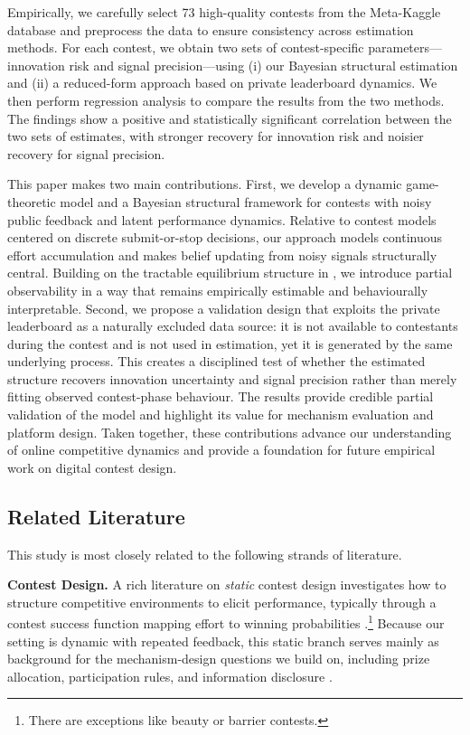 \documentclass[mnsc]{informs3}
\begin{document}
Empirically, we carefully select 73 high-quality contests from the Meta-Kaggle database and preprocess the data to ensure consistency across estimation methods.
For each contest, we obtain two sets of contest-specific parameters—innovation risk and signal precision—using (i) our Bayesian structural estimation and (ii) a reduced-form approach based on private leaderboard dynamics.
We then perform regression analysis to compare the results from the two methods.
The findings show a positive and statistically significant correlation between the two sets of estimates, with stronger recovery for innovation risk and noisier recovery for signal precision.


This paper makes two main contributions.
First, we develop a dynamic game-theoretic model and a Bayesian structural framework for contests with noisy public feedback and latent performance dynamics.
Relative to contest models centered on discrete submit-or-stop decisions, our approach models continuous effort accumulation and makes belief updating from noisy signals structurally central.
Building on the tractable equilibrium structure in \citet{Ryvkin2022Fight}, we introduce partial observability in a way that remains empirically estimable and behaviourally interpretable.
Second, we propose a validation design that exploits the private leaderboard as a naturally excluded data source: it is not available to contestants during the contest and is not used in estimation, yet it is generated by the same underlying process.
This creates a disciplined test of whether the estimated structure recovers innovation uncertainty and signal precision rather than merely fitting observed contest-phase behaviour.
The results provide credible partial validation of the model and highlight its value for mechanism evaluation and platform design.
Taken together, these contributions advance our understanding of online competitive dynamics and provide a foundation for future empirical work on digital contest design.



\subsection{Related Literature}

This study is most closely related to the following strands of literature.

\textbf{Contest Design.}
A rich literature on \textit{static} contest design \citep{ales2017optimal_award} investigates how to structure competitive environments to elicit performance, typically through a contest success function mapping effort to winning probabilities \citep{skaperdas1996contest}.\footnote{There are exceptions like beauty or barrier contests.}
Because our setting is dynamic with repeated feedback, this static branch serves mainly as background for the mechanism-design questions we build on, including prize allocation, participation rules, and information disclosure \citep{moldovanu2001optimal, ales2021number_of_players, bergemann2022optimal}.
\end{document}
